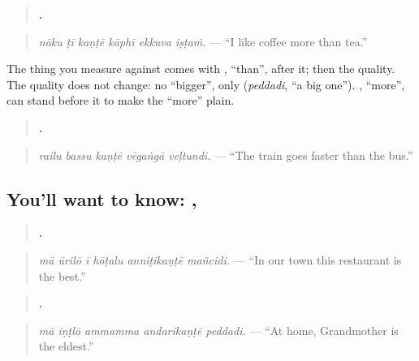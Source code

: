 \begin{quote}
\textbf{     .}
\end{quote}

\begin{quote}
\emph{nāku ṭī kaṇṭē kāphī ekkuva iṣṭaṁ.} — \textquotedblleft{}I like coffee more than tea.\textquotedblright{}
\end{quote}

The thing you measure against comes with \textbf{}, \textquotedblleft{}than\textquotedblright{}, after it; then the quality. The quality does not change: no \textquotedblleft{}bigger\textquotedblright{}, only \textbf{} (\emph{peddadi}, \textquotedblleft{}a big one\textquotedblright{}). \textbf{}, \textquotedblleft{}more\textquotedblright{}, can stand before it to make the \textquotedblleft{}more\textquotedblright{} plain.

\begin{quote}
\textbf{    .}
\end{quote}

\begin{quote}
\emph{railu bassu kaṇṭē vēgaṅgā veḷtundi.} — \textquotedblleft{}The train goes faster than the bus.\textquotedblright{}
\end{quote}

\subsection*{You'll want to know: , }
\begin{quote}
\textbf{     .}
\end{quote}

\begin{quote}
\emph{mā ūrilō ī hōṭalu anniṭikaṇṭē mañcidi.} — \textquotedblleft{}In our town this restaurant is the best.\textquotedblright{}
\end{quote}

\begin{quote}
\textbf{    .}
\end{quote}

\begin{quote}
\emph{mā iṇṭlō ammamma andarikaṇṭē peddadi.} — \textquotedblleft{}At home, Grandmother is the eldest.\textquotedblright{}
\end{quote}

